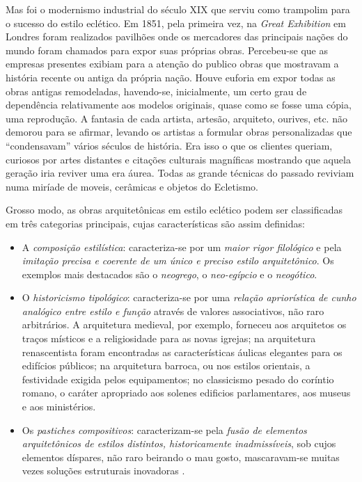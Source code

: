 Mas foi o modernismo industrial do século XIX que serviu como trampolim para o sucesso do estilo eclético. Em 1851, pela primeira vez, na \textit{Great Exhibition} em Londres foram realizados pavilhões onde os mercadores das principais nações do mundo foram chamados para expor suas próprias obras. Percebeu-se que as empresas presentes exibiam para a atenção do publico obras que mostravam a história recente ou antiga da própria nação. Houve euforia em expor todas as obras antigas remodeladas, havendo-se, inicialmente, um certo grau de dependência relativamente aos modelos originais, quase como se fosse uma cópia, uma reprodução. A fantasia de cada artista, artesão, arquiteto, ourives, etc. não demorou para se afirmar, levando os artistas a formular obras personalizadas que ``condensavam'' vários séculos de história. Era isso o que os clientes queriam, curiosos por artes distantes e citações culturais magníficas mostrando que aquela geração iria reviver uma era áurea. Todas as grande técnicas do passado reviviam numa miríade de moveis, cerâmicas e
objetos do Ecletismo.

Grosso modo, as obras arquitetônicas em estilo eclético podem ser classificadas em três categorias principais, cujas características são assim definidas:

\begin{itemize}
\item A \textit{composição estilística}: caracteriza-se por um \textit{maior rigor filológico} e pela \textit{imitação precisa e coerente de um único e preciso estilo arquitetônico}. Os exemplos mais destacados são o \textit{neogrego}, o \textit{neo-egípcio} e o \textit{neogótico}.
\item O \textit{historicismo tipológico}: caracteriza-se por uma \textit{relação apriorística de cunho analógico entre estilo e função} através de valores associativos, não raro arbitrários. A arquitetura medieval, por exemplo, forneceu aos arquitetos os traços místicos e a religiosidade para as novas igrejas; na arquitetura renascentista foram encontradas as características áulicas elegantes para os edifícios públicos; na arquitetura barroca, ou nos estilos orientais, a festividade exigida pelos equipamentos; no classicismo pesado do coríntio romano, o caráter apropriado aos solenes edificios parlamentares, aos museus e aos ministérios.
\item Os \textit{pastiches compositivos}: caracterizam-se pela \textit{fusão de elementos arquitetônicos de estilos distintos, historicamente inadmissíveis}, sob cujos elementos díspares, não raro beirando o mau gosto, mascaravam-se muitas vezes soluções estruturais inovadoras \cite[p.~14-15]{patetta_ecletismo_1987}.
\end{itemize}

